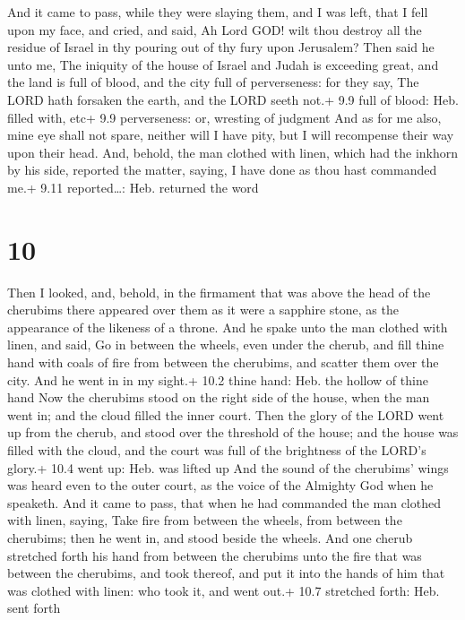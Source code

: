  And it came to pass, while they were slaying them, and I
was left, that I fell upon my face, and cried, and said, Ah Lord GOD!
wilt thou destroy all the residue of Israel in thy pouring out of thy
fury upon Jerusalem?  Then said he unto me, The iniquity of
the house of Israel and Judah is exceeding great, and the land is full
of blood, and the city full of perverseness: for they say, The LORD hath
forsaken the earth, and the LORD seeth not.+ 9.9 full of blood: Heb.
filled with, etc+ 9.9 perverseness: or, wresting of judgment
 And as for me also, mine eye shall not spare, neither will
I have pity, but I will recompense their way upon their head.
 And, behold, the man clothed with linen, which had the
inkhorn by his side, reported the matter, saying, I have done as thou
hast commanded me.+ 9.11 reported\ldots: Heb. returned the word

\hypertarget{section-9}{%
\section{10}\label{section-9}}

 Then I looked, and, behold, in the firmament that was above
the head of the cherubims there appeared over them as it were a sapphire
stone, as the appearance of the likeness of a throne.  And
he spake unto the man clothed with linen, and said, Go in between the
wheels, even under the cherub, and fill thine hand with coals of fire
from between the cherubims, and scatter them over the city. And he went
in in my sight.+ 10.2 thine hand: Heb. the hollow of thine hand
 Now the cherubims stood on the right side of the house,
when the man went in; and the cloud filled the inner court. 
Then the glory of the LORD went up from the cherub, and stood over the
threshold of the house; and the house was filled with the cloud, and the
court was full of the brightness of the LORD's glory.+ 10.4 went up:
Heb. was lifted up  And the sound of the cherubims' wings
was heard even to the outer court, as the voice of the Almighty God when
he speaketh.  And it came to pass, that when he had
commanded the man clothed with linen, saying, Take fire from between the
wheels, from between the cherubims; then he went in, and stood beside
the wheels.  And one cherub stretched forth his hand from
between the cherubims unto the fire that was between the cherubims, and
took thereof, and put it into the hands of him that was clothed with
linen: who took it, and went out.+ 10.7 stretched forth: Heb. sent forth

